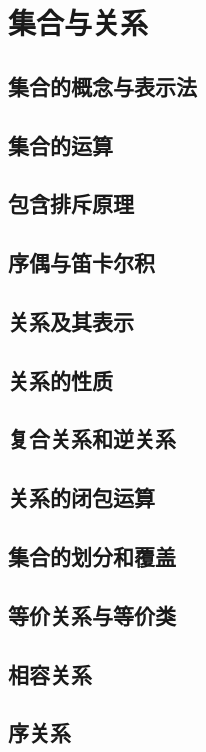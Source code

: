 \section{集合与关系}

\subsection{集合的概念与表示法}

\subsection{集合的运算}

\subsection{包含排斥原理}

\subsection{序偶与笛卡尔积}

\subsection{关系及其表示}

\subsection{关系的性质}

\subsection{复合关系和逆关系}

\subsection{关系的闭包运算}

\subsection{集合的划分和覆盖}

\subsection{等价关系与等价类}

\subsection{相容关系}

\subsection{序关系}